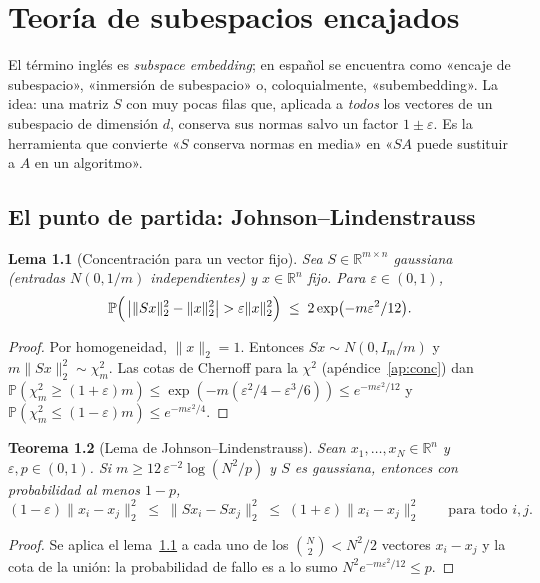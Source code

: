 \documentclass[11pt,a4paper,oneside]{book}
\newtheorem{teorema}{Teorema}[chapter]
\newtheorem{lema}[teorema]{Lema}
\theoremstyle{definition}
\theoremstyle{remark}
\newcommand{\R}{\mathbb{R}}
\newcommand{\Prob}{\mathbb{P}}
\newcommand{\eps}{\varepsilon}
\newcommand{\nrm}[1]{\lVert #1\rVert}
\begin{document}
\chapter{Teoría de subespacios encajados}\label{cap:embed}

El término inglés es \emph{subspace embedding}; en español se encuentra como «encaje de subespacio»,
«inmersión de subespacio» o, coloquialmente, «subembedding». La idea: una matriz $S$ con muy pocas filas
que, aplicada a \emph{todos} los vectores de un subespacio de dimensión $d$, conserva sus normas salvo un
factor $1\pm\eps$. Es la herramienta que convierte «$S$ conserva normas en media» en «$SA$ puede sustituir a
$A$ en un algoritmo».

\section{El punto de partida: Johnson--Lindenstrauss}

\begin{lema}[Concentración para un vector fijo]\label{lem:jl-dist}
Sea $S\in\R^{m\times n}$ gaussiana (entradas $N(0,1/m)$ independientes) y $x\in\R^n$ fijo. Para $\eps\in(0,1)$,
\[ \Prob\Bigl(\,\bigl|\nrm{Sx}_2^2-\nrm{x}_2^2\bigr|>\eps\nrm{x}_2^2\Bigr)\;\le\;2\exp\bigl(-m\eps^2/12\bigr). \]
\end{lema}

\begin{proof}
Por homogeneidad, $\nrm{x}_2=1$. Entonces $Sx\sim N(0,I_m/m)$ y $m\nrm{Sx}_2^2\sim\chi^2_m$. Las cotas de Chernoff
para la $\chi^2$ (apéndice~\ref{ap:conc}) dan
$\Prob(\chi^2_m\ge(1+\eps)m)\le\exp(-m(\eps^2/4-\eps^3/6))\le e^{-m\eps^2/12}$ y $\Prob(\chi^2_m\le(1-\eps)m)\le e^{-m\eps^2/4}$.
\end{proof}

\begin{teorema}[Lema de Johnson--Lindenstrauss]\label{teo:jl}
Sean $x_1,\dots,x_N\in\R^n$ y $\eps,p\in(0,1)$. Si $m\ge12\,\eps^{-2}\log(N^2/p)$ y $S$ es gaussiana, entonces
con probabilidad al menos $1-p$,
\[ (1-\eps)\nrm{x_i-x_j}_2^2\;\le\;\nrm{Sx_i-Sx_j}_2^2\;\le\;(1+\eps)\nrm{x_i-x_j}_2^2\qquad\text{para todo } i,j. \]
\end{teorema}

\begin{proof}
Se aplica el lema~\ref{lem:jl-dist} a cada uno de los $\binom N2<N^2/2$ vectores $x_i-x_j$ y la cota de la unión:
la probabilidad de fallo es a lo sumo $N^2e^{-m\eps^2/12}\le p$.
\end{proof}
\end{document}
